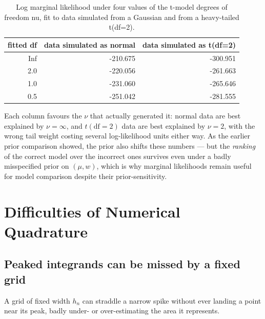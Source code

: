 \documentclass[
  letterpaper,
  DIV=11,
  numbers=noendperiod]{scrreprt}
\begin{document}
{

\begin{longtable}[]{@{}rrr@{}}

\caption{\label{tbl-compare-models}Log marginal likelihood under four
values of the t-model degrees of freedom nu, fit to data simulated from
a Gaussian and from a heavy-tailed t(df=2).}

\tabularnewline

\toprule\noalign{}
fitted df & data simulated as normal & data simulated as t(df=2) \\
\midrule\noalign{}
\endhead
\bottomrule\noalign{}
\endlastfoot
Inf & -210.675 & -300.951 \\
2.0 & -220.056 & -261.663 \\
1.0 & -231.060 & -265.646 \\
0.5 & -251.042 & -281.555 \\

\end{longtable}

}

Each column favours the \(\nu\) that actually generated it: normal data
are best explained by \(\nu=\infty\), and \(t(\text{df}=2)\) data are
best explained by \(\nu=2\), with the wrong tail weight costing several
log-likelihood units either way. As the earlier prior comparison showed,
the prior also shifts these numbers --- but the \emph{ranking} of the
correct model over the incorrect ones survives even under a badly
misspecified prior on \((\mu,w)\), which is why marginal likelihoods
remain useful for model comparison despite their prior-sensitivity.

\section{Difficulties of Numerical
Quadrature}\label{difficulties-of-numerical-quadrature}

\subsection{Peaked integrands can be missed by a fixed
grid}\label{peaked-integrands-can-be-missed-by-a-fixed-grid}

A grid of fixed width \(h_n\) can straddle a narrow spike without ever
landing a point near its peak, badly under- or over-estimating the area
it represents.
\end{document}
